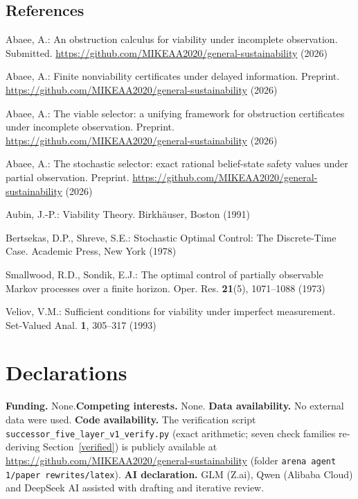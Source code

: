 \documentclass[10pt,twocolumn]{article}
\theoremstyle{definition}
\begin{document}
\subsection{References}\label{references}
{\footnotesize

Abaee, A.: An obstruction calculus for viability under incomplete
observation. Submitted.
\url{https://github.com/MIKEAA2020/general-sustainability} (2026)

Abaee, A.: Finite nonviability certificates under delayed information.
Preprint. \url{https://github.com/MIKEAA2020/general-sustainability} (2026)

Abaee, A.: The viable selector: a unifying framework for obstruction
certificates under incomplete observation. Preprint.
\url{https://github.com/MIKEAA2020/general-sustainability} (2026)

Abaee, A.: The stochastic selector: exact rational belief-state safety
values under partial observation. Preprint.
\url{https://github.com/MIKEAA2020/general-sustainability} (2026)

Aubin, J.-P.: Viability Theory. Birkh\"auser, Boston (1991)

Bertsekas, D.P., Shreve, S.E.: Stochastic Optimal Control: The Discrete-Time
Case. Academic Press, New York (1978)

Smallwood, R.D., Sondik, E.J.: The optimal control of partially observable
Markov processes over a finite horizon. Oper. Res. \textbf{21}(5),
1071--1088 (1973)

Veliov, V.M.: Sufficient conditions for viability under imperfect
measurement. Set-Valued Anal. \textbf{1}, 305--317 (1993)

}

\section*{Declarations}

\textbf{Funding.} None.\quad \textbf{Competing interests.} None.\quad
\textbf{Data availability.} No external data were used.\quad
\textbf{Code availability.} The verification script
\texttt{successor\_five\_layer\_v1\_verify.py} (exact arithmetic; seven
check families re-deriving Section~\ref{verified}) is publicly available at
\url{https://github.com/MIKEAA2020/general-sustainability} (folder
\texttt{arena agent 1/paper rewrites/latex}).\quad
\textbf{AI declaration.} GLM (Z.ai), Qwen (Alibaba Cloud) and DeepSeek AI
assisted with drafting and iterative review.
\end{document}
